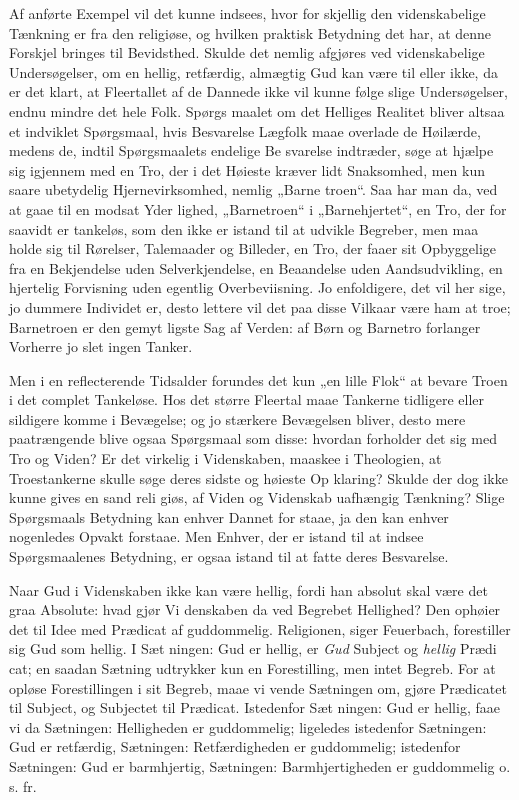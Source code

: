 \documentclass[12pt]{book}
\newcommand{\opage}[1]{\marginnote{\footnotesize\textit{[#1]}}}
\begin{document}
Af anførte Exempel vil det kunne indsees, hvor for\-%
skjellig den videnskabelige Tænkning er fra den religiøse,
og hvilken praktisk Betydning det har, at denne Forskjel
bringes til Bevidsthed. Skulde det nemlig afgjøres ved
videnskabelige Undersøgelser, om en hellig, retfærdig,
almægtig Gud kan være til eller ikke, da er det klart,
at Fleertallet af de Dannede ikke vil kunne følge slige
Undersøgelser, endnu mindre det hele Folk. Spørgs\-%
maalet om det Helliges Realitet bliver altsaa et indviklet
Spørgsmaal, hvis Besvarelse Lægfolk maae overlade de
Høilærde, medens de, indtil Spørgsmaalets endelige Be\-%
svarelse indtræder, søge at hjælpe sig igjennem med en
Tro, der i det Høieste kræver lidt Snaksomhed, men
kun saare ubetydelig Hjernevirksomhed, nemlig „Barne\-%
troen“. Saa har man da, ved at gaae til en modsat Yder\-%
lighed, „Barnetroen“ i „Barnehjertet“, en Tro, der for\-%
saavidt er tankeløs, som den ikke er istand til at udvikle
Begreber, men maa holde sig til Rørelser, Talemaader
og Billeder, en Tro, der faaer sit Opbyggelige fra en
Bekjendelse uden Selverkjendelse, en Beaandelse uden
Aandsudvikling, en hjertelig Forvisning uden egentlig
Overbeviisning. Jo enfoldigere, det vil her sige, jo
dummere Individet er, desto lettere vil det paa disse
Vilkaar være ham at troe; Barnetroen er den gemyt\-%
ligste Sag af Verden: af Børn og Barnetro forlanger
Vorherre jo slet ingen Tanker.

Men i en reflecterende Tidsalder forundes det kun
„en lille Flok“ at bevare Troen i det complet Tankeløse.
Hos det større Fleertal maae Tankerne tidligere eller
sildigere komme i Bevægelse; og jo stærkere Bevægelsen
bliver, desto mere paatrængende blive ogsaa Spørgsmaal
som disse: hvordan forholder det sig med Tro og Viden?
\opage{112}\setcounter{footnote}{0}%
Er det virkelig i Videnskaben, maaskee i Theologien,
at Troestankerne skulle søge deres sidste og høieste Op\-%
klaring? Skulde der dog ikke kunne gives en sand reli\-%
giøs, af Viden og Videnskab uafhængig Tænkning?
Slige Spørgsmaals Betydning kan enhver Dannet for\-%
staae, ja den kan enhver nogenledes Opvakt forstaae.
Men Enhver, der er istand til at indsee Spørgsmaalenes
Betydning, er ogsaa istand til at fatte deres Besvarelse.

Naar Gud i Videnskaben ikke kan være hellig, fordi
han absolut skal være det graa Absolute: hvad gjør Vi\-%
denskaben da ved Begrebet Hellighed? Den ophøier
det til Idee med Prædicat af guddommelig. Religionen,
siger Feuerbach, forestiller sig Gud som hellig. I Sæt\-%
ningen: Gud er hellig, er \textit{Gud} Subject og \textit{hellig} Prædi\-%
cat; en saadan Sætning udtrykker kun en Forestilling,
men intet Begreb. For at opløse Forestillingen i sit
Begreb, maae vi vende Sætningen om, gjøre Prædicatet
til Subject, og Subjectet til Prædicat. Istedenfor Sæt\-%
ningen: Gud er hellig, faae vi da Sætningen: Helligheden
er guddommelig; ligeledes istedenfor Sætningen: Gud er
retfærdig, Sætningen: Retfærdigheden er guddommelig;
istedenfor Sætningen: Gud er barmhjertig, Sætningen:
Barmhjertigheden er guddommelig o. s. fr.
\end{document}
